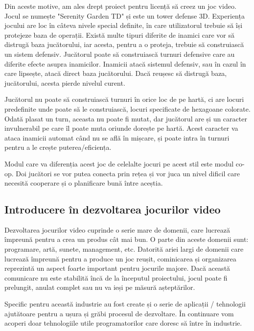 \documentclass[12pt, a4paper]{article}
\begin{document}
	Din aceste motive, am ales drept proiect pentru licență să creez un joc video. Jocul se numește "Serenity Garden TD" și este un tower defense 3D. Experiența jocului are loc în câteva nivele special definite, în care utilizatorul trebuie să își protejeze baza de operații. Există multe tipuri diferite de inamici care vor să distrugă baza jucătorului, iar acesta, pentru a o proteja, trebuie să construiască un sistem defensiv. Jucătorul poate să construiască turnuri defensive care au diferite efecte asupra inamicilor. Inamicii atacă sistemul defensiv, sau în cazul în care lipsește, atacă direct baza jucătorului. Dacă reușesc să distrugă baza, jucătorului, acesta pierde nivelul curent.
	\newline
	
	Jucătorul nu poate să construiască turnuri în orice loc de pe hartă, ci are locuri predefinite unde poate să le construiască, locuri specificate de hexagoane colorate. Odată plasat un turn, aceasta nu poate fi mutat, dar jucătorul are și un caracter invulnerabil pe care îl poate muta oriunde dorește pe hartă. Acest caracter va ataca inamicii automat când nu se află în mișcare, și poate intra în turnuri pentru a le crește puterea/eficiența.
	\newline
	
	Modul care va diferenția acest joc de celelalte jocuri pe acest stil este modul co-op. Doi jucători se vor putea conecta prin rețea și vor juca un nivel dificil care necesită cooperare și o planificare bună între aceștia.
	
	
	
	
	
	\subsection{Introducere în dezvoltarea jocurilor video}
	
	Dezvoltarea jocurilor video cuprinde o serie mare de domenii, care lucrează împreună pentru a crea un produs cât mai bun. O parte din aceste domenii sunt: programare, artă, sunete, management, etc. Datorită ariei largi de domenii care lucrează împreună pentru a produce un joc reușit, cominicarea și organizarea reprezintă un aspect foarte important pentru jocurile majore. Dacă această comunicare nu este stabilită încă de la începutul proiectului, jocul poate fi prelungit, anulat complet sau nu va ieși pe măsură așteptărilor.
	\newline
	
	Specific pentru această industrie au fost create și o serie de aplicații / tehnologii ajutătoare pentru a ușura și grăbi procesul de dezvoltare. În continuare vom acoperi doar tehnologiile utile programatorilor care doresc să între în industrie.
	\newline
	
\end{document}
